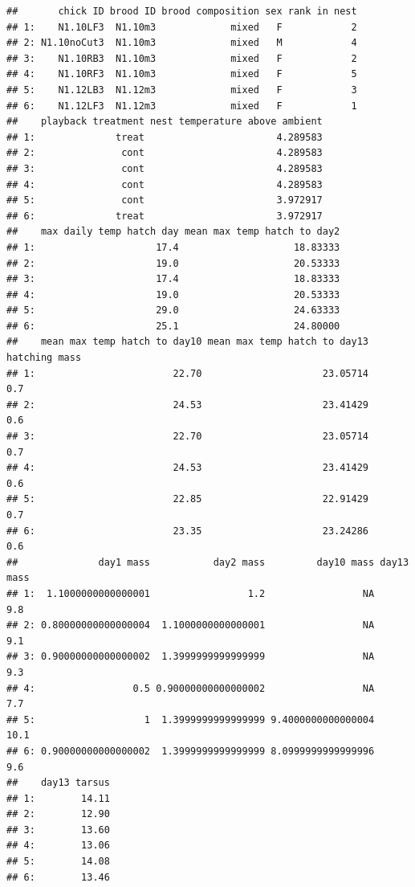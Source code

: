 \documentclass[]{book}
\theoremstyle{definition}
\theoremstyle{definition}
\theoremstyle{definition}
\theoremstyle{remark}
\begin{document}
\begin{verbatim}
##       chick ID brood ID brood composition sex rank in nest
## 1:    N1.10LF3  N1.10m3             mixed   F            2
## 2: N1.10noCut3  N1.10m3             mixed   M            4
## 3:    N1.10RB3  N1.10m3             mixed   F            2
## 4:    N1.10RF3  N1.10m3             mixed   F            5
## 5:    N1.12LB3  N1.12m3             mixed   F            3
## 6:    N1.12LF3  N1.12m3             mixed   F            1
##    playback treatment nest temperature above ambient
## 1:              treat                       4.289583
## 2:               cont                       4.289583
## 3:               cont                       4.289583
## 4:               cont                       4.289583
## 5:               cont                       3.972917
## 6:              treat                       3.972917
##    max daily temp hatch day mean max temp hatch to day2
## 1:                     17.4                    18.83333
## 2:                     19.0                    20.53333
## 3:                     17.4                    18.83333
## 4:                     19.0                    20.53333
## 5:                     29.0                    24.63333
## 6:                     25.1                    24.80000
##    mean max temp hatch to day10 mean max temp hatch to day13 hatching mass
## 1:                        22.70                     23.05714           0.7
## 2:                        24.53                     23.41429           0.6
## 3:                        22.70                     23.05714           0.7
## 4:                        24.53                     23.41429           0.6
## 5:                        22.85                     22.91429           0.7
## 6:                        23.35                     23.24286           0.6
##              day1 mass           day2 mass         day10 mass day13 mass
## 1:  1.1000000000000001                 1.2                 NA        9.8
## 2: 0.80000000000000004  1.1000000000000001                 NA        9.1
## 3: 0.90000000000000002  1.3999999999999999                 NA        9.3
## 4:                 0.5 0.90000000000000002                 NA        7.7
## 5:                   1  1.3999999999999999 9.4000000000000004       10.1
## 6: 0.90000000000000002  1.3999999999999999 8.0999999999999996        9.6
##    day13 tarsus
## 1:        14.11
## 2:        12.90
## 3:        13.60
## 4:        13.06
## 5:        14.08
## 6:        13.46
\end{verbatim}
\end{document}

